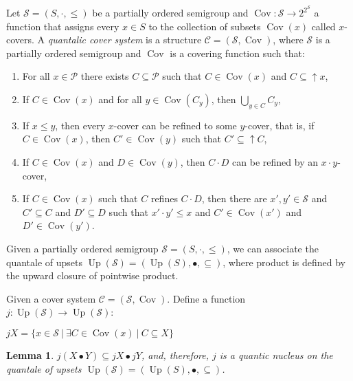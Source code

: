 \documentclass[a4paper]{article}
\theoremstyle{defin}
\theoremstyle{theorem}
\theoremstyle{claim}
\theoremstyle{prop}
\theoremstyle{lemma}
\newtheorem{lemma}{Lemma}
\theoremstyle{fact}
\theoremstyle{ex}
\theoremstyle{col}
\begin{document}
Let $\mathcal{S} = (S, \cdot, \leq)$ be a partially ordered semigroup and $\operatorname{Cov} : \mathcal{S} \to 2^{2^{\mathcal{S}}}$ a function that assigns every $x \in S$ to the collection of subsets $\operatorname{Cov}(x)$ called $x$-covers. A \emph{quantalic cover system} is a structure $\mathcal{C} = (\mathcal{S}, \operatorname{Cov})$, where $\mathcal{S}$ is a partially ordered semigroup and $\operatorname{Cov}$ is a covering function such that:
\begin{enumerate}
\item For all $x \in \mathcal{P}$ there exists $C \subseteq \mathcal{P}$ such that $C \in \operatorname{Cov}(x)$ and $C \subseteq \uparrow x$,
\item If $C \in \operatorname{Cov}(x)$ and for all $y \in \operatorname{Cov}(C_y)$, then $\bigcup \limits_{y \in C} C_y$,
\item If $x \leq y$, then every $x$-cover can be refined to some $y$-cover, that is, if $C \in \operatorname{Cov}(x)$, then $C' \in \operatorname{Cov}(y)$ such that $C' \subseteq \uparrow C$,
\item If $C \in \operatorname{Cov}(x)$ and $D \in \operatorname{Cov}(y)$, then $C \cdot D$ can be refined by an $x \cdot y$-cover,
\item If $C \in \operatorname{Cov}(x)$ such that $C$ refines $C \cdot D$, then there are $x', y' \in \mathcal{S}$ and $C' \subseteq C$ and $D' \subseteq D$ such that $x' \cdot y' \leq x$ and $C' \in \operatorname{Cov}(x')$ and $D' \in \operatorname{Cov}(y')$.
\end{enumerate}

Given a partially ordered semigroup $\mathcal{S} = (S, \cdot, \leq)$, we can associate the quantale of upsets $\operatorname{Up}(\mathcal{S}) = (\operatorname{Up}(S), \bullet, \subseteq)$, where product is defined by the upward closure of pointwise product.

Given a cover system $\mathcal{C} = (\mathcal{S}, \operatorname{Cov})$. Define a function $j : \operatorname{Up}(\mathcal{S}) \to \operatorname{Up}(\mathcal{S})$:
\begin{center}
$j X = \{ x \in \mathcal{S} \: | \: \exists C \in \operatorname{Cov}(x) \: | \: C \subseteq X \}$
\end{center}

\begin{lemma}
$j (X \bullet Y) \subseteq j X \bullet j Y$, and, therefore, $j$ is a quantic nucleus on the quantale of upsets $\operatorname{Up}(\mathcal{S}) = (\operatorname{Up}(S), \bullet, \subseteq)$.
\end{lemma}
\end{document}
